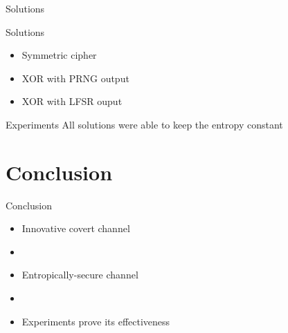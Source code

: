 \documentclass[11pt, compress]{beamer}
\begin{document}
\begin{frame}{Solutions}
    \vfill
    \begin{block}{Solutions}
        \begin{itemize}
        \item Symmetric cipher
        \item XOR with PRNG output
        \item XOR with LFSR ouput
        \end{itemize}
    \end{block}
    \vfill
    \begin{block}{Experiments}
        All solutions were able to keep the entropy constant
    \end{block}
    \vfill
\end{frame}




\section{Conclusion}
\begin{frame}{Conclusion}
\begin{itemize}
\item Innovative covert channel
\item []
\item Entropically-secure channel
\item []
\item Experiments prove its effectiveness
\end{itemize}
\end{frame}


\end{document}
